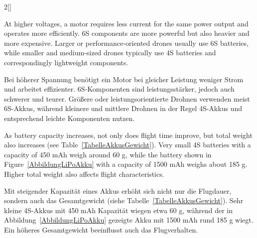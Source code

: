 \begin{paracol}{2}[]
\colstart

At higher voltages, a motor requires less current for the same power output and operates more efficiently. 6S components are more powerful but also heavier and more expensive. Larger or performance-oriented drones usually use 6S batteries, while smaller and medium-sized drones typically use 4S batteries and correspondingly lightweight components.

\colger

Bei höherer Spannung benötigt ein Motor bei gleicher Leistung weniger Strom und arbeitet effizienter. 6S-Komponenten sind leistungsstärker, jedoch auch schwerer und teurer. Größere oder leistungsorientierte Drohnen verwenden meist 6S-Akkus, während kleinere und mittlere Drohnen in der Regel 4S-Akkus und entsprechend leichte Komponenten nutzen.

\coleng

As battery capacity increases, not only does flight time improve, but total weight also increases (see Table~\ref{TabelleAkkusGewicht}). Very small 4S batteries with a capacity of 450 mAh weigh around 60 g, while the battery shown in Figure~\ref{AbbildungLiPoAkku} with a capacity of 1500 mAh weighs about 185 g. Higher total weight also affects flight characteristics.

\colger

Mit steigender Kapazität eines Akkus erhöht sich nicht nur die Flugdauer, sondern auch das Gesamtgewicht (siehe Tabelle~\ref{TabelleAkkusGewicht}). Sehr kleine 4S-Akkus mit 450 mAh Kapazität wiegen etwa 60 g, während der in Abbildung~\ref{AbbildungLiPoAkku} gezeigte Akku mit 1500 mAh rund 185 g wiegt. Ein höheres Gesamtgewicht beeinflusst auch das Flugverhalten.


\colende


\end{paracol}
